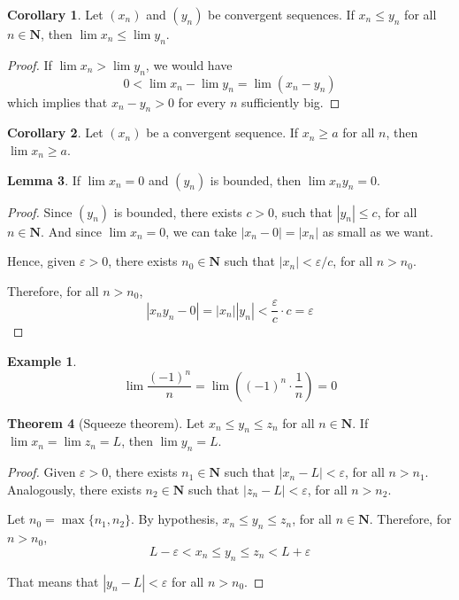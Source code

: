 \documentclass[12pt,a4paper]{article}
\theoremstyle{definition}
\newtheorem{theorem}{Theorem}[section]
\newtheorem{corollary}[theorem]{Corollary}
\newtheorem{lemma}[theorem]{Lemma}
\newtheorem{example}{Example}[section]
\begin{document}
\begin{corollary}
	Let $(x_n)$ and $(y_n)$ be convergent sequences. If $x_n \leq y_n$ for all $n \in \textbf{N}$, then $\lim x_n \leq \lim y_n$.
\end{corollary}
\begin{proof}
	If $\lim x_n > \lim y_n$, we would have \[ 0 < \lim x_n - \lim y_n = \lim (x_n - y_n) \] which implies that $x_n - y_n > 0$ for every $n$ sufficiently big.
\end{proof}

\begin{corollary}
	Let $(x_n)$ be a convergent sequence. If $x_n \geq a$ for all $n$, then $\lim x_n \geq a$.
\end{corollary}

\begin{lemma}\label{zeroandbound}
	If $\lim x_n = 0$ and $(y_n)$ is bounded, then $\lim x_n y_n = 0$.
\end{lemma}

\begin{proof}
	Since $(y_n)$ is bounded, there exists $c > 0$, such that $|y_n| \leq c$, for all $n \in \textbf{N}$. And since $\lim x_n = 0$, we can take $|x_n - 0| = |x_n|$ as small as we want.
	
	Hence, given $\varepsilon > 0$, there exists $n_0 \in \textbf{N}$ such that $|x_n| < \varepsilon / c$, for all $n > n_0$.
	
	Therefore, for all $n > n_0$, 
	\[
		|x_n y_n - 0| = |x_n| |y_n| < \frac{\varepsilon}{c} \cdot c = \varepsilon
	\]
\end{proof}

\begin{example}
	\[ \lim \frac{(-1)^n}{n} = \lim \left( (-1)^n \cdot \frac{1}{n} \right) = 0 \]
\end{example}

\begin{theorem}[Squeeze theorem]
	Let $x_n \leq y_n \leq z_n$ for all $n \in \textbf{N}$. If $\lim x_n = \lim z_n = L$, then $\lim y_n = L$.
\end{theorem}

\begin{proof}
	Given $\varepsilon > 0$, there exists $n_1 \in \textbf{N}$ such that $|x_n - L| < \varepsilon$, for all $n > n_1$. Analogously, there exists $n_2 \in \textbf{N}$ such that $|z_n - L| < \varepsilon$, for all $n > n_2$.
	
	Let $n_0 = \max \{n_1, n_2\}$. By hypothesis, $x_n \leq y_n \leq z_n$, for all $n \in \textbf{N}$. Therefore, for $n > n_0$, \[ L - \varepsilon < x_n \leq y_n \leq z_n < L + \varepsilon \]
	
	That means that $|y_n - L| < \varepsilon$ for all $n > n_0$.
\end{proof}
\end{document}
